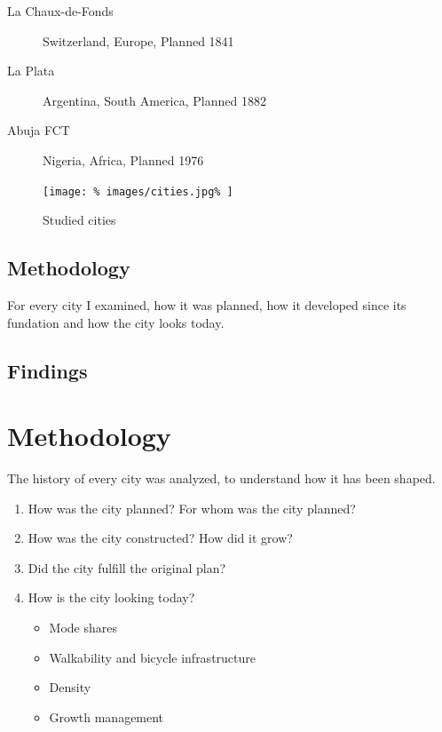 \documentclass{article}
\begin{document}
		\begin{description}
			\item [La Chaux-de-Fonds] Switzerland, Europe, Planned 1841
			\item [La Plata] Argentina, South America, Planned 1882
			\item [Abuja FCT] Nigeria, Africa, Planned 1976
		\end{description}
		
		\begin{figure}[H]
			\texttt{[image: \%
				images/cities.jpg\%
			]}
			\caption{Studied cities \cite{BingMaps:Cities}}
			\label{fig:map:analyzed-cities}
		\end{figure}

		\subsection{Methodology}
		For every city I examined, how it was planned, how it developed since its fundation and how the city looks today.

		\subsection{Findings}
		


	\clearpage
	\section{Methodology}
	
	The history of every city was analyzed, to understand how it has been shaped.
	
	\begin{enumerate}
		\item How was the city planned? For whom was the city planned?
		\item How was the city constructed? How did it grow?
		\item Did the city fulfill the original plan?
		\item How is the city looking today?
			\begin{itemize}
				\item Mode shares
				\item Walkability and bicycle infrastructure
				\item Density
				\item Growth management
			\end{itemize}
	\end{enumerate}
\end{document}
